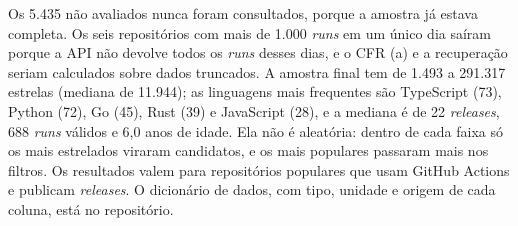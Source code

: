 Os 5.435 não avaliados nunca foram consultados, porque a amostra já estava completa. Os seis
repositórios com mais de 1.000 \textit{runs} em um único dia saíram porque a API não devolve
todos os \textit{runs} desses dias, e o CFR (a) e a recuperação seriam calculados sobre dados
truncados. A amostra final tem de 1.493 a 291.317 estrelas (mediana de 11.944); as
linguagens mais frequentes são TypeScript (73), Python (72), Go (45), Rust (39) e JavaScript
(28), e a mediana é de 22 \textit{releases}, 688 \textit{runs} válidos e 6,0 anos de idade.
Ela não é aleatória: dentro de cada faixa só os mais estrelados viraram candidatos, e os mais
populares passaram mais nos filtros. Os resultados valem para repositórios populares que usam
GitHub Actions e publicam \textit{releases}. O dicionário de dados, com tipo, unidade e origem
de cada coluna, está no repositório.
